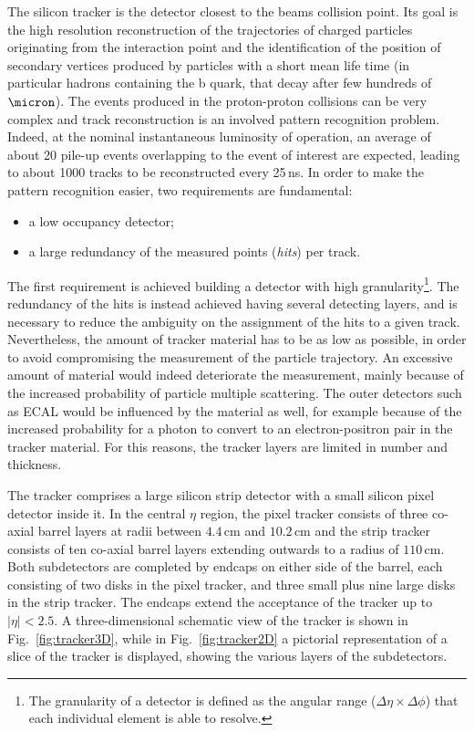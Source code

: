 The silicon tracker is the detector closest to the beams collision point. Its goal is the high resolution reconstruction of the trajectories of charged particles originating from the interaction point and the identification of the position of secondary vertices produced by particles with a short mean life time (in particular hadrons containing the b quark, that decay after few hundreds of $\micron$). The events produced in the proton-proton collisions can be very complex and track reconstruction is an involved pattern recognition problem. Indeed, at the nominal instantaneous luminosity of operation, an average of about 20 pile-up events overlapping to the event of interest are expected, leading to about 1000 tracks to be reconstructed every 25\,ns. In order to make the pattern recognition easier, two requirements are fundamental:
\begin{itemize}
\item a low occupancy detector;
\item a large redundancy of the measured points (\emph{hits}) per track.
\end{itemize}
The first requirement is achieved building a detector with high granularity\footnote{The granularity of a detector is defined as the angular range ($\Delta\eta\times\Delta\phi$) that each individual element is able to resolve.}. The redundancy of the hits is instead achieved having several detecting layers, and is necessary to reduce the ambiguity on the assignment of the hits to a given track. Nevertheless, the amount of tracker material has to be as low as possible, in order to avoid compromising the measurement of the particle trajectory. An excessive amount of material would indeed deteriorate the measurement, mainly because of the increased probability of particle multiple scattering. The outer detectors such as ECAL would be influenced by the material as well, for example because of the increased probability for a photon to convert to an electron-positron pair in the tracker material. For this reasons, the tracker layers are limited in number and thickness.

The tracker comprises a large silicon strip detector with a small silicon pixel detector inside it. In the central $\eta$ region, the pixel tracker consists of three co-axial barrel layers at radii between $4.4$\,cm and $10.2$\,cm and the strip tracker consists of ten co-axial barrel layers extending outwards to a radius of $110$\,cm. Both subdetectors are completed by endcaps on either
side of the barrel, each consisting of two disks in the pixel tracker, and three small plus nine large disks in the strip tracker. The endcaps extend the acceptance of the tracker up to $|\eta|<2.5$. A three-dimensional schematic view of the tracker is shown in Fig.~\ref{fig:tracker3D}, while in Fig.~\ref{fig:tracker2D} a pictorial representation of a slice of the tracker is displayed, showing the various layers of the subdetectors.

